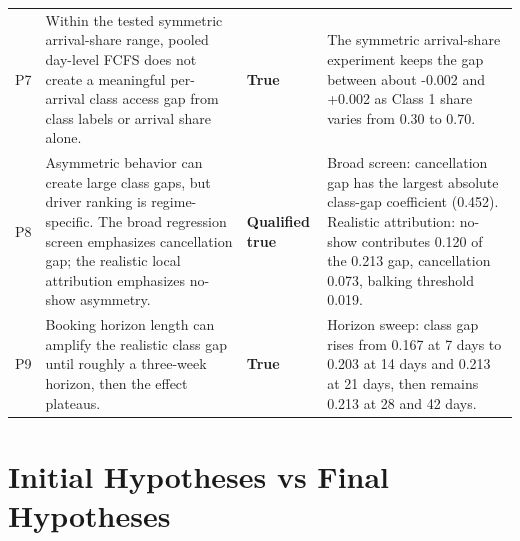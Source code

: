 \documentclass[11pt]{article}
\newcommand{\status}[1]{\textbf{#1}}
\begin{document}
\begin{longtable}{P{0.07\textwidth} P{0.44\textwidth} P{0.13\textwidth} P{0.28\textwidth}}
P7 &
Within the tested symmetric arrival-share range, pooled day-level FCFS does not
create a meaningful per-arrival class access gap from class labels or arrival
share alone. &
\status{True} &
The symmetric arrival-share experiment keeps the gap between about -0.002 and
+0.002 as Class 1 share varies from 0.30 to 0.70. \\

P8 &
Asymmetric behavior can create large class gaps, but driver ranking is
regime-specific. The broad regression screen emphasizes cancellation gap; the
realistic local attribution emphasizes no-show asymmetry. &
\status{Qualified true} &
Broad screen: cancellation gap has the largest absolute class-gap coefficient
(0.452). Realistic attribution: no-show contributes 0.120 of the 0.213 gap,
cancellation 0.073, balking threshold 0.019. \\

P9 &
Booking horizon length can amplify the realistic class gap until roughly a
three-week horizon, then the effect plateaus. &
\status{True} &
Horizon sweep: class gap rises from 0.167 at 7 days to 0.203 at 14 days and
0.213 at 21 days, then remains 0.213 at 28 and 42 days. \\
\bottomrule
\end{longtable}

\section*{Initial Hypotheses vs Final Hypotheses}
\end{document}
